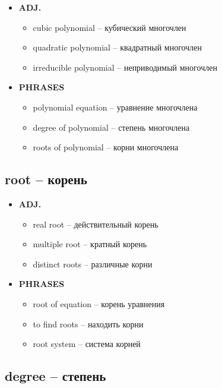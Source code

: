 \documentclass[a4paper, 10pt]{article}
\theoremstyle{definition}
\theoremstyle{plain}
\theoremstyle{remark}
\begin{document}
\begin{itemize}
    \item \textbf{ADJ.}
    \begin{itemize}
        \item cubic polynomial – кубический многочлен
        \item quadratic polynomial – квадратный многочлен
        \item irreducible polynomial – неприводимый многочлен
    \end{itemize}
    
    \item \textbf{PHRASES}
    \begin{itemize}
        \item polynomial equation – уравнение многочлена
        \item degree of polynomial – степень многочлена
        \item roots of polynomial – корни многочлена
    \end{itemize}
\end{itemize}

\subsection{root – корень}

\begin{itemize}
    \item \textbf{ADJ.}
    \begin{itemize}
        \item real root – действительный корень
        \item multiple root – кратный корень
        \item distinct roots – различные корни
    \end{itemize}
    
    \item \textbf{PHRASES}
    \begin{itemize}
        \item root of equation – корень уравнения
        \item to find roots – находить корни
        \item root system – система корней
    \end{itemize}
\end{itemize}

\subsection{degree – степень}
\end{document}
